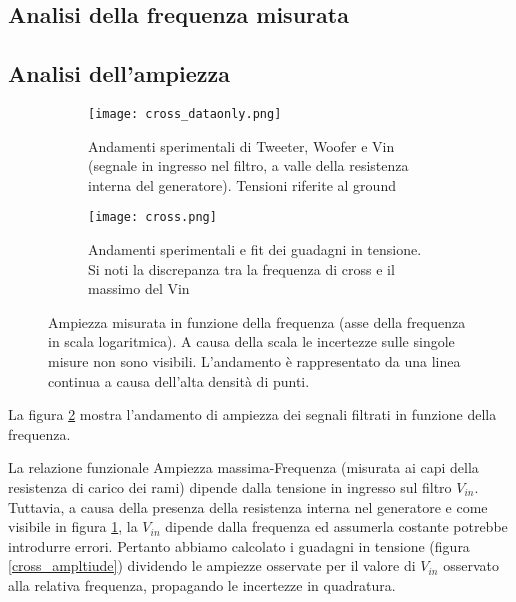 \documentclass[../Relazione_circuiti]{subfiles}
\begin{document}
\subsection{Analisi della frequenza misurata}

\subsection{Analisi dell'ampiezza}

\begin{figure}[H]
\centering

\begin{subfigure}{=0.5\textwidth}

\texttt{[image: cross\_dataonly.png]}

\caption{Andamenti sperimentali di Tweeter, Woofer e Vin (segnale in ingresso nel filtro, a valle della resistenza interna del generatore). Tensioni riferite al ground}
\label{fig: amplitude_dataonly}

\end{subfigure}

\begin{subfigure}{=0.5\textwidth}

    \texttt{[image: cross.png]}

    \caption{Andamenti sperimentali e fit dei guadagni in tensione. Si noti la discrepanza tra la frequenza di cross e il massimo del Vin}
    
    \end{subfigure}

\caption{Ampiezza misurata in funzione della frequenza (asse della frequenza in scala logaritmica). A causa della scala le incertezze sulle singole misure non sono visibili. L'andamento è rappresentato da una linea continua a causa dell'alta densità di punti.}
\label{fig: cross_amplitude}

\end{figure}

La figura \ref{fig: cross_amplitude} mostra l'andamento di ampiezza dei segnali filtrati in funzione della frequenza. 

La relazione funzionale Ampiezza massima-Frequenza (misurata ai capi della resistenza di carico dei rami) dipende dalla tensione in ingresso sul filtro $V_{in}$.
Tuttavia, a causa della presenza della resistenza interna nel generatore e come visibile in figura \ref{fig: amplitude_dataonly}, la $V_{in}$ dipende dalla frequenza ed assumerla costante potrebbe introdurre errori.
Pertanto abbiamo calcolato i guadagni in tensione (figura \ref{cross_ampltiude}) dividendo le ampiezze osservate per il valore di $V_{in}$ osservato alla relativa frequenza, propagando le incertezze in quadratura.
\end{document}
